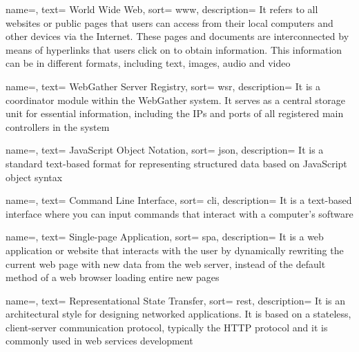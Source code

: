{
  name=,
  text= World Wide Web,
  sort= www,
  description= {It refers to all websites or public pages that users can access from their local computers and other devices via the Internet. These pages and documents are interconnected by means of hyperlinks that users click on to obtain information. This information can be in different formats, including text, images, audio and video}
}

{
  name=,
  text= WebGather Server Registry,
  sort= wsr,
  description= {It is a coordinator module within the WebGather system. It serves as a central storage unit for essential information, including the IPs and ports of all registered main controllers in the system}
}

{
  name=,
  text= JavaScript Object Notation,
  sort= json,
  description= {It is a standard text-based format for representing structured data based on JavaScript object syntax}
}

{
  name=,
  text= Command Line Interface,
  sort= cli,
  description= {It is a text-based interface where you can input commands that interact with a computer's software}
}

{
  name=,
  text= Single-page Application,
  sort= spa,
  description= {It is a web application or website that interacts with the user by dynamically rewriting the current web page with new data from the web server, instead of the default method of a web browser loading entire new pages}
}

{
  name=,
  text= Representational State Transfer,
  sort= rest,
  description= {It is an architectural style for designing networked applications. It is based on a stateless, client-server communication protocol, typically the \acrshort{HTTP} protocol and it is commonly used in web services development}
}

